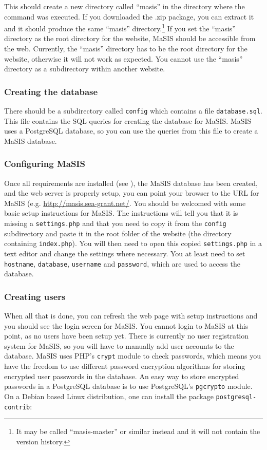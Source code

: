 \documentclass[twoside,a4paper]{refart}
\begin{document}
This should create a new directory called ``masis'' in the directory where the command was executed. If you downloaded the .zip package, you can extract it and it should produce the same ``masis'' directory.\footnote{It may be called ``masis-master'' or similar instead and it will not contain the version history.} If you set the ``masis'' directory as the root directory for the website, MaSIS should be accessible from the web. Currently, the ``masis'' directory has to be the root directory for the website, otherwise it will not work as expected. You cannot use the ``masis'' directory as a subdirectory within another website.

\subsubsection{Creating the database}

There should be a subdirectory called \texttt{config} which contains a file \texttt{database.sql}. This file contains the SQL queries for creating the database for MaSIS. MaSIS uses a PostgreSQL database, so you can use the queries from this file to create a MaSIS database.

\subsubsection{Configuring MaSIS}

Once all requirements are installed (see ), the MaSIS database has been created, and the web server is properly setup, you can point your browser to the URL for MaSIS (e.g. \url{http://masis.sea-grant.net/}. You should be welcomed with some basic setup instructions for MaSIS. The instructions will tell you that it is missing a \texttt{settings.php} and that you need to copy it from the \texttt{config} subdirectory and paste it in the root folder of the website (the directory containing \texttt{index.php}). You will then need to open this copied \texttt{settings.php} in a text editor and change the settings where necessary. You at least need to set \texttt{hostname}, \texttt{database}, \texttt{username} and \texttt{password}, which are used to access the database.

\subsubsection{Creating users}

When all that is done, you can refresh the web page with setup instructions and you should see the login screen for MaSIS. You cannot login to MaSIS at this point, as no users have been setup yet. There is currently no user registration system for MaSIS, so you will have to manually add user accounts to the database. MaSIS uses PHP's \texttt{crypt} module to check passwords, which means you have the freedom to use different password encryption algorithms for storing encrypted user passwords in the database. An easy way to store encrypted passwords in a PostgreSQL database is to use PostgreSQL's \texttt{pgcrypto} module. On a Debian based Linux distribution, one can install the package \texttt{postgresql-contrib}:
\end{document}
